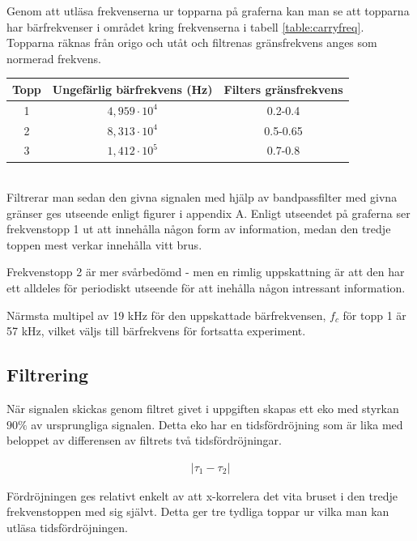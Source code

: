 \documentclass[10pt]{article}
\begin{document}
Genom att utläsa frekvenserna ur topparna på graferna kan man se att topparna har bärfrekvenser i området kring frekvenserna i tabell \ref{table:carryfreq}. Topparna räknas från origo och utåt och filtrenas gränsfrekvens anges som normerad frekvens. 
~\\
\begin{center}
\begin{tabular}{c | c | c}
	\hline
	Topp & Ungefärlig bärfrekvens (Hz) & Filters gränsfrekvens \\ \hline
	1 & $4,959 \cdot 10^4$ & 0.2-0.4 \\ \hline
	2 & $8,313 \cdot 10^4$ & 0.5-0.65 \\ \hline
	3 & $1,412 \cdot 10^5$ & 0.7-0.8 \\ \hline
\end{tabular}
 \label{table:carryfreq}
\end{center}
~\\
Filtrerar man sedan den givna signalen med hjälp av bandpassfilter med givna gränser ges utseende enligt figurer i appendix A. Enligt utseendet på graferna ser frekvenstopp 1 ut att innehålla någon form av information, medan den tredje toppen mest verkar innehålla vitt brus. 

Frekvenstopp 2 är mer svårbedömd - men en rimlig uppskattning är att den har ett alldeles för periodiskt utseende för att inehålla någon intressant information. 

Närmsta multipel av 19 kHz för den uppskattade bärfrekvensen, $f_c$ för topp 1 är 57 kHz, vilket väljs till bärfrekvens för fortsatta experiment. 

\newpage

\subsection{Filtrering}

När signalen skickas genom filtret givet i uppgiften skapas ett eko med styrkan $90\%$ av ursprungliga signalen. Detta eko har en tidsfördröjning som är lika med beloppet av differensen av filtrets två tidsfördröjningar.

\begin{gather}
|\tau_1 - \tau_2|
\label{equ:delay}
\end{gather}

Fördröjningen ges relativt enkelt av att x-korrelera det vita bruset i den tredje frekvenstoppen med sig självt. Detta ger tre tydliga toppar ur vilka man kan utläsa tidsfördröjningen. 
\end{document}
